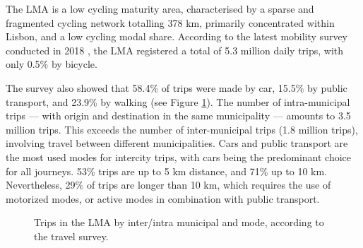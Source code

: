 \documentclass[review, doubleblind, 3p,
authoryear]{elsarticle} %
\providecommand{\DIFaddbeginFL}{} %
\providecommand{\DIFaddendFL}{} %
\providecommand{\DIFdelbeginFL}{} %
\providecommand{\DIFdelendFL}{} %
\newcommand{\DIFscaledelfig}{0.5}
\newlength{\DIFdelgraphicswidth} %
\newlength{\DIFdelgraphicsheight} %
\newcommand{\DIFaddincludegraphics}[2][]{{\color{blue}\fbox{\DIFOincludegraphics[#1]{#2}}}} %
\newcommand{\DIFdelincludegraphics}[2][]{%
\sbox{\DIFdelgraphicsbox}{\DIFOincludegraphics[#1]{#2}}%
\settoboxwidth{\DIFdelgraphicswidth}{\DIFdelgraphicsbox} %
\settoboxtotalheight{\DIFdelgraphicsheight}{\DIFdelgraphicsbox} %
\scalebox{\DIFscaledelfig}{%
\parbox[b]{\DIFdelgraphicswidth}{\usebox{\DIFdelgraphicsbox}\\[-\baselineskip] \rule{\DIFdelgraphicswidth}{0em}}\llap{\resizebox{\DIFdelgraphicswidth}{\DIFdelgraphicsheight}{%
\setlength{\unitlength}{\DIFdelgraphicswidth}%
\begin{picture}(1,1)%
\thicklines\linethickness{2pt} %
{\color[rgb]{1,0,0}\put(0,0){\framebox(1,1){}}}%
{\color[rgb]{1,0,0}\put(0,0){\line( 1,1){1}}}%
{\color[rgb]{1,0,0}\put(0,1){\line(1,-1){1}}}%
\end{picture}%
}\hspace*{3pt}}} %
} %
\DeclareRobustCommand{\DIFaddbeginFL}{\DIFOaddbeginFL \let\includegraphics\DIFaddincludegraphics} %
\DeclareRobustCommand{\DIFaddendFL}{\DIFOaddendFL \let\includegraphics\DIFOincludegraphics} %
\DeclareRobustCommand{\DIFdelbeginFL}{\DIFOdelbeginFL \let\includegraphics\DIFdelincludegraphics} %
\DeclareRobustCommand{\DIFdelendFL}{\DIFOaddendFL \let\includegraphics\DIFOincludegraphics} %
\begin{document}
The LMA is a low cycling maturity area, characterised by a sparse and
fragmented cycling network totalling 378 km, primarily concentrated
within Lisbon, and a low cycling modal share. According to the latest
mobility survey conducted in 2018 \citep{IMOB}, the LMA registered a
total of 5.3 million daily trips, with only 0.5\% by bicycle.

The survey also showed that 58.4\% of trips were made by car, 15.5\% by
public transport, and 23.9\% by walking (see Figure \ref{fig:mododist}).
The number of intra-municipal trips --- with origin and destination in
the same municipality --- amounts to 3.5 million trips. This exceeds the
number of inter-municipal trips (1.8 million trips), involving travel
between different municipalities. Cars and public transport are the most
used modes for intercity trips, with cars being the predominant choice
for all journeys. 53\% trips are up to 5 km distance, and 71\% up to 10
km. Nevertheless, 29\% of trips are longer than 10 km, which requires
the use of motorized modes, or active modes in combination with public
transport.

\begin{figure}
\DIFdelbeginFL %
\DIFdelendFL \DIFaddbeginFL {}\DIFaddendFL \caption{\label{mododist}Trips in the LMA by inter/intra municipal and mode, according to the travel survey.}\label{fig:mododist}
\end{figure}
\end{document}
